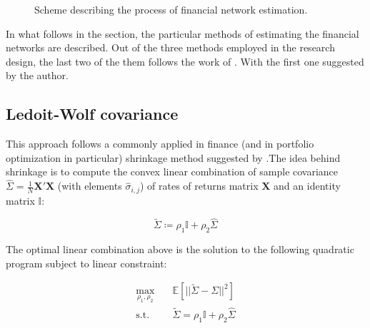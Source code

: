 \documentclass[12pt]{article}
\begin{document}
\begin{figure}
	\caption{Scheme describing the process of financial network estimation.}
	\label{fig:connectedness_scheme}
\end{figure}



In what follows in the section, the particular methods of estimating the financial networks are described. Out of the three methods employed in the research design, the last two of the them follows the work of \cite{billio12}. With the first one suggested by the author. 

\subsection{Ledoit-Wolf covariance}\label{subsection:ledoit_wolf}

This approach follows a commonly applied in finance (and in portfolio optimization in particular) shrinkage method suggested by \cite{ledoit03}.The idea behind shrinkage is to compute the convex linear combination of sample covariance $\hat{\Sigma} = \frac{1}{N}\boldsymbol{X}'\boldsymbol{X}$ (with elements $\hat{\sigma}_{i,j}$) of rates of returns matrix $\boldsymbol{X}$ and an identity matrix $\mathbb{I}$:

\begin{equation}
	\tilde{\Sigma} \coloneqq \rho_1 \mathbb{I} + \rho_2 \hat{\Sigma}
\end{equation}

The optimal linear combination above is the solution to the following quadratic program subject to linear constraint:

\begin{equation}
	\begin{aligned}
	\max_{\rho_1, \rho_2} \quad &  \mathbb{E}[|| \tilde{\Sigma} - \Sigma||^2] \\
	\textrm{s.t.} \quad & \tilde{\Sigma} = \rho_1 \mathbb{I} + \rho_2 \hat{\Sigma}
	\end{aligned}
\end{equation}
\end{document}
